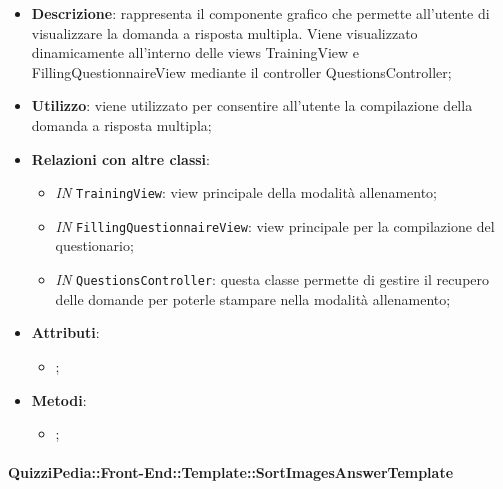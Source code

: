 		\begin{itemize}
			\item \textbf{Descrizione}: rappresenta il componente grafico che permette all'utente di visualizzare la domanda a risposta multipla. Viene visualizzato dinamicamente all'interno delle views TrainingView e FillingQuestionnaireView mediante il controller QuestionsController;
			\item \textbf{Utilizzo}: viene utilizzato per consentire all'utente la compilazione della domanda a risposta multipla;
			\item \textbf{Relazioni con altre classi}: 
			\begin{itemize}
				\item \textit{IN} \texttt{TrainingView}: view principale della modalità allenamento; 
				\item \textit{IN} \texttt{FillingQuestionnaireView}: view principale per la compilazione del questionario;
				\item \textit{IN} \texttt{QuestionsController}: questa classe permette di gestire il recupero delle domande per poterle stampare nella modalità allenamento;
			\end{itemize}
			\item \textbf{Attributi}: 
			\begin{itemize}
				\item ;
			\end{itemize}
			\item \textbf{Metodi}: 
			\begin{itemize}
				\item ;
			\end{itemize}
		\end{itemize}
		
		\paragraph{QuizziPedia::Front-End::Template::SortImagesAnswerTemplate}
		
		\label{QuizziPedia::Front-End::Templates::SortImagesAnswerTemplate}
		
